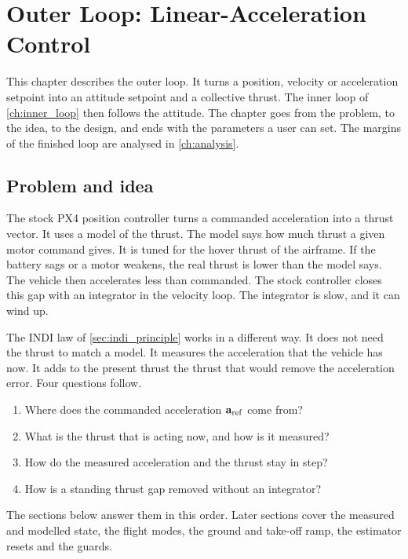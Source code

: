 \chapter{Outer Loop: Linear-Acceleration Control}\label{ch:outer_loop}

This chapter describes the outer loop.
It turns a position, velocity or acceleration setpoint into an attitude setpoint and a collective thrust.
The inner loop of \cref{ch:inner_loop} then follows the attitude.
The chapter goes from the problem, to the idea, to the design, and ends with the parameters a user can set.
The margins of the finished loop are analysed in \cref{ch:analysis}.

\section{Problem and idea}\label{sec:outer_problem}

The stock PX4 position controller turns a commanded acceleration into a thrust vector.
It uses a model of the thrust.
The model says how much thrust a given motor command gives.
It is tuned for the hover thrust of the airframe.
If the battery sags or a motor weakens, the real thrust is lower than the model says.
The vehicle then accelerates less than commanded.
The stock controller closes this gap with an integrator in the velocity loop.
The integrator is slow, and it can wind up.

The INDI law of \cref{sec:indi_principle} works in a different way.
It does not need the thrust to match a model.
It measures the acceleration that the vehicle has now.
It adds to the present thrust the thrust that would remove the acceleration error.
Four questions follow.
\begin{enumerate}
  \item Where does the commanded acceleration $\mathbf{a}_{\mathrm{ref}}$ come from?
  \item What is the thrust that is acting now, and how is it measured?
  \item How do the measured acceleration and the thrust stay in step?
  \item How is a standing thrust gap removed without an integrator?
\end{enumerate}
The sections below answer them in this order.
Later sections cover the measured and modelled state, the flight modes, the ground and take-off ramp, the estimator resets and the guards.

